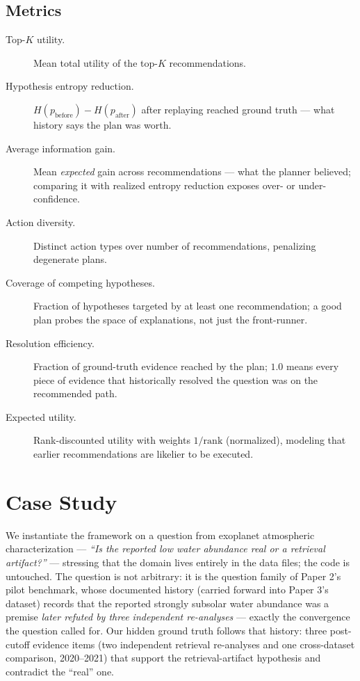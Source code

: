 \documentclass[11pt]{article}
\newcommand{\Ent}{H}
\begin{document}
\subsection{Metrics}

\begin{description}
  \item[Top-$K$ utility.] Mean total utility of the top-$K$
  recommendations.
  \item[Hypothesis entropy reduction.] $\Ent(p_{\text{before}}) -
  \Ent(p_{\text{after}})$ after replaying reached ground truth ---
  what history says the plan was worth.
  \item[Average information gain.] Mean \emph{expected} gain across
  recommendations --- what the planner believed; comparing it with
  realized entropy reduction exposes over- or under-confidence.
  \item[Action diversity.] Distinct action types over number of
  recommendations, penalizing degenerate plans.
  \item[Coverage of competing hypotheses.] Fraction of hypotheses
  targeted by at least one recommendation; a good plan probes the space
  of explanations, not just the front-runner.
  \item[Resolution efficiency.] Fraction of ground-truth evidence
  reached by the plan; $1.0$ means every piece of evidence that
  historically resolved the question was on the recommended path.
  \item[Expected utility.] Rank-discounted utility with weights
  $1/\mathrm{rank}$ (normalized), modeling that earlier recommendations
  are likelier to be executed.
\end{description}

\section{Case Study}
\label{sec:case}

We instantiate the framework on a question from exoplanet atmospheric
characterization --- \emph{``Is the reported low water abundance real or
a retrieval artifact?''} --- stressing that the domain lives entirely in
the data files; the code is untouched. The question is not arbitrary: it
is the question family of Paper 2's pilot benchmark, whose documented
history (carried forward into Paper 3's dataset) records that the
reported strongly subsolar water abundance was a premise \emph{later
refuted by three independent re-analyses} --- exactly the convergence the
question called for. Our hidden ground truth follows that history: three
post-cutoff evidence items (two independent retrieval re-analyses and
one cross-dataset comparison, 2020--2021) that support the
retrieval-artifact hypothesis and contradict the ``real'' one.
\end{document}
